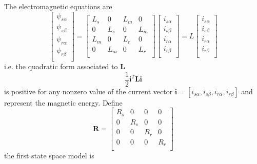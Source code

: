 \documentclass[12pt,a4paper]{scrartcl}
\begin{document}
\begin{onehalfspace}
The electromagnetic equations are
\begin{equation}\label{eq39}
	\left[\begin{matrix}
		\psi_{s\alpha} \\[6pt]
		\psi_{s\beta} \\[6pt]
		\psi_{r\alpha} \\[6pt]
		\psi_{r\beta} \\[6pt]
	\end{matrix}\right] = 
	\left[\begin{matrix}
		L_s & 0 & L_m & 0 \\[6pt]
		0 & L_s & 0 & L_m \\[6pt]
		L_m & 0 & L_r & 0 \\[6pt]
		0 & L_m & 0 & L_r \\[6pt]
	\end{matrix}\right]
	\left[\begin{matrix}
		i_{s\alpha} \\[6pt]
		i_{s\beta} \\[6pt]
		i_{r\alpha} \\[6pt]
		i_{r\beta} \\[6pt]
	\end{matrix}\right] = L
	\left[\begin{matrix}
		i_{s\alpha} \\[6pt]
		i_{s\beta} \\[6pt]
		i_{r\alpha} \\[6pt]
		i_{r\beta} \\[6pt]
	\end{matrix}\right]
\end{equation}
i.e. the quadratic form associated to $\mathbf{L}$
\begin{equation}\label{eq40}
	\frac{1}{2}\mathbf{i}^T\mathbf{L}\mathbf{i}
\end{equation}
is positive for any nonzero value of the current vector $\mathbf{i}=[i_{s\alpha}, i_{s\beta}, i_{r\alpha}, i_{r\beta}]$ and represent the magnetic energy.
Define 
\begin{equation}\label{eq42}
	\mathbf{R}=
	\left[\begin{matrix}
		R_s & 0 & 0 & 0 \\[6pt]
		0 & R_s & 0 & 0 \\[6pt]
		0 & 0 & R_r & 0 \\[6pt]
		0 & 0 & 0 & R_r \\[6pt]
	\end{matrix}\right]
\end{equation}
the first state space model is

\end{onehalfspace}
\end{document}

